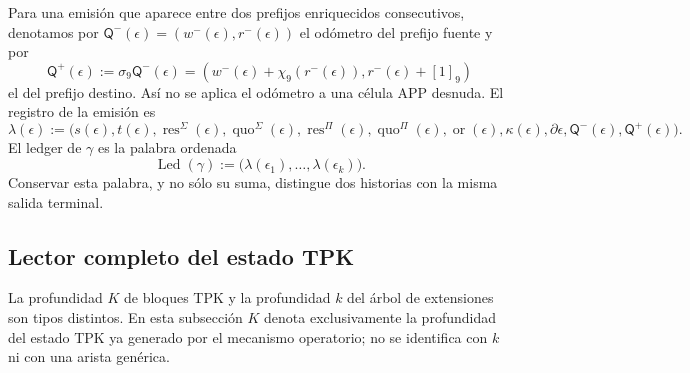 \begin{definition}
\label{def:continuo-comun-ledger-elemental}
Para una emisión que aparece entre dos prefijos enriquecidos consecutivos,
denotamos por
\(\mathsf Q^-(\epsilon)=(w^-(\epsilon),r^-(\epsilon))\) el odómetro del
prefijo fuente y por
\begin{equation}
\label{eq:continuo-comun-ledger-fase-extremos}
 \mathsf Q^+(\epsilon):=\sigma_9\mathsf Q^-(\epsilon)
 =(w^-(\epsilon)+\chi_9(r^-(\epsilon)),r^-(\epsilon)+[1]_9)
\end{equation}
el del prefijo destino. Así no se aplica el odómetro a una célula APP
desnuda. El registro de la emisión es
\begin{equation}
\label{eq:continuo-comun-ledger-elemental}
 \lambda(\epsilon):=\bigl(
 s(\epsilon),t(\epsilon),
 \operatorname{res}^{\Sigma}(\epsilon),
 \operatorname{quo}^{\Sigma}(\epsilon),
 \operatorname{res}^{\Pi}(\epsilon),
 \operatorname{quo}^{\Pi}(\epsilon),
 \operatorname{or}(\epsilon),
 \kappa(\epsilon),
 \partial\epsilon,
 \mathsf Q^-(\epsilon),\mathsf Q^+(\epsilon)\bigr).
\end{equation}
El ledger de \(\gamma\) es la palabra ordenada
\begin{equation}
\label{eq:continuo-comun-ledger-ruta}
 \operatorname{Led}(\gamma)
 :=\bigl(\lambda(\epsilon_1),\ldots,
          \lambda(\epsilon_k)\bigr).
\end{equation}
Conservar esta palabra, y no sólo su suma, distingue dos historias con la
misma salida terminal.
\end{definition}

\subsection{Lector completo del estado TPK}
\label{sec:continuo-comun-lector-estado-tpk}

La profundidad \(K\) de bloques TPK y la profundidad \(k\) del árbol de
extensiones son tipos distintos. En esta subsección \(K\) denota
exclusivamente la profundidad del estado TPK ya generado por el mecanismo
operatorio; no se identifica con \(k\) ni con una arista genérica.

